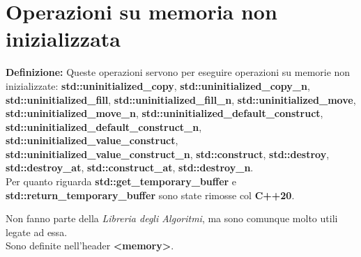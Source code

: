 \newpage

\section{Operazioni su memoria non inizializzata}

\textsf{\small \textbf{Definizione: } Queste operazioni servono per eseguire operazioni su memorie non inizializzate: \textbf{std::uninitialized\_copy}, \textbf{std::uninitialized\_copy\_n}, \textbf{std::uninitialized\_fill}, \textbf{std::uninitialized\_fill\_n}, \textbf{std::uninitialized\_move}, \textbf{std::uninitialized\_move\_n}, \textbf{std::uninitialized\_default\_construct}, \textbf{std::uninitialized\_default\_construct\_n}, \textbf{std::uninitialized\_value\_construct}, \textbf{std::uninitialized\_value\_construct\_n}, \textbf{std::construct}, \textbf{std::destroy}, \textbf{std::destroy\_at}, \textbf{std::construct\_at}, \textbf{std::destroy\_n}.} \\

\textsf{\small Per quanto riguarda \textbf{std::get\_temporary\_buffer} e \textbf{std::return\_temporary\_buffer} sono state rimosse col \textbf{C++20}.} \break

\textsf{\small Non fanno parte della \emph{Libreria degli Algoritmi}, ma sono comunque molto utili legate ad essa.} \\ %

\textsf{\small Sono definite nell'header \textbf{<memory>}.} \\

